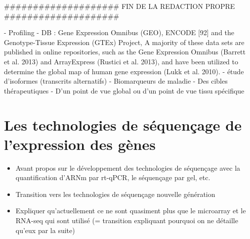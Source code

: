 \#\#\#\#\#\#\#\#\#\#\#\#\#\#\#\#\#\#\#\# FIN DE LA REDACTION PROPRE  \#\#\#\#\#\#\#\#\#\#\#\#\#\#\#\#\#\#\#\#



- Profiling
    - DB : Gene Expression Omnibus (GEO), ENCODE [92] and the Genotype-Tissue Expression (GTEx) Project, A majority of these data sets are published in online repositories, such as the Gene Expression Omnibus (Barrett et al. 2013) and ArrayExpress (Rustici et al. 2013), and have been utilized to determine the global map of human gene expression (Lukk et al. 2010).
- étude d'isoformes (transcrits alternatifs)
- Biomarqueurs de maladie
- Des cibles thérapeutiques
- D'un point de vue global ou d'un point de vue tissu spécifique



\section{Les technologies de séquençage de l'expression des gènes}



\begin{itemize}
\item Avant propos sur le développement des technologies de séquençage avec la quantification d'ARNm par rt-qPCR, le séquençage par gel, etc.
\item Transition vers les technologies de séquençage nouvelle génération
\item Expliquer qu'actuellement ce ne sont quasiment plus que le microarray et le RNA-seq qui sont utilisé (= transition expliquant pourquoi on ne détaille qu'eux par la suite)
\end{itemize}




